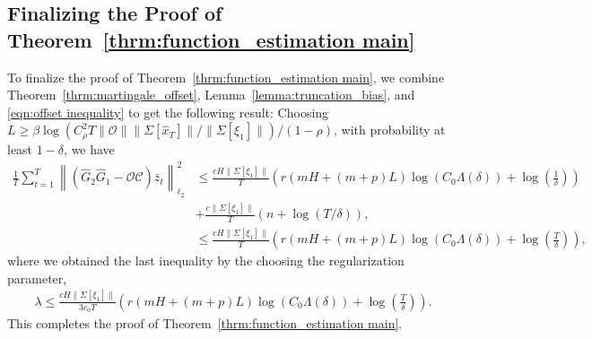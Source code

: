 \documentclass[11pt]{article}
\newcommand{\zbar}{\bar{z}}
\newcommand{\xtil}{\hat{x}}
\newcommand{\Ccal}{\mathcal{C}}
\newcommand{\Ocal}{\mathcal{O}}
\newcommand{\tn}[1]{\left\|{#1}\right\|_{\ell_2}}
\newcommand{\nn}{\nonumber}
\newcommand{\norm}[1]{\|{#1} \|}
\newcommand{\<}{\langle}
\renewcommand{\>}{\rangle}
\numberwithin{equation}{section}
\begin{document}
\subsection{Finalizing the Proof of Theorem~\ref{thrm:function_estimation main}}
To finalize the proof of Theorem~\ref{thrm:function_estimation main}, we combine Theorem~\ref{thrm:martingale_offset}, Lemma~\ref{lemma:truncation_bias}, and \eqref{eqn:offset inequality} to get the following result: Choosing $ L \geq \beta \log\left(C_\rho^2 T \norm{\Ocal}\norm{\Sigma[\xtil_T]}/\norm{\Sigma[\xi_1]}\right)/(1-\rho)$, with probability at least $1-\delta$, we have
\begin{align}
    \frac{1}{T}\sum_{t=1}^{T}\tn{\left(\hat{G}_2 \hat{G}_1 - \Ocal \Ccal\right) \zbar_t}^2 &\leq  \frac{cH\norm{\Sigma[\xi_1]}}{T}  \left( r \left(mH + (m+p)L \right)\log \left(C_0 \Lambda(\delta)\right) + \log \left(\frac{1}{\delta}\right) \right) \nn \\
    & +\frac{c \norm{\Sigma[\xi_1]}}{T} \left(n + \log (T/\delta)\right), \nn \\
    &\leq  \frac{cH\norm{\Sigma[\xi_1]}}{T}  \left( r \left(mH + (m+p)L \right)\log \left(C_0 \Lambda(\delta)\right) + \log \left(\frac{T}{\delta}\right) \right),
\end{align}
where we obtained the last inequality by the choosing the regularization parameter,
\begin{align}
    \lambda \leq \frac{cH\norm{\Sigma[\xi_1]}}{3c_0T}  \left( r \left(mH + (m+p)L \right)\log \left(C_0 \Lambda(\delta)\right) + \log \left(\frac{T}{\delta}\right) \right).
\end{align}
This completes the proof of Theorem~\ref{thrm:function_estimation main}.
%
\end{document}

